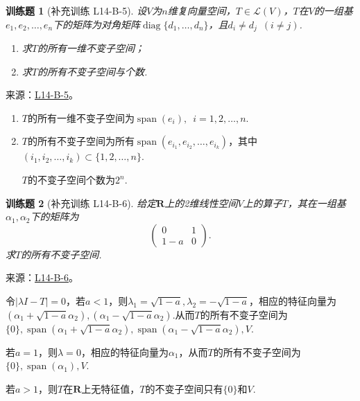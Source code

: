 \documentclass[UTF8,12pt,a4paper,fontset=fandol]{ctexart}
\newtheorem{exercise}{训练题}[section]
\begin{document}
\begin{exercise}[补充训练 L14-B-5]\label{prob:L14-B-5}
设$V$为$n$维复向量空间，$T\in \mathcal{L}(V)$，$T$在$V$的一组基$e_1,e_2,\ldots,e_n$下的矩阵为对角矩阵$\operatorname{diag}\{d_1,\ldots,d_n\}$，且$d_i\neq d_j\enspace(i\neq j)$.
        \begin{enumerate}
            \item 求$T$的所有一维不变子空间；

            \item 求$T$的所有不变子空间与个数.
        \end{enumerate}
\end{exercise}
\noindent 来源：\href{https://github.com/yhwu-is/Linear-Algebra-Left-Undone/blob/new/%E8%AE%B2%E4%B9%89/%E4%B8%93%E9%A2%98/14%20%E7%9B%B8%E4%BC%BC%E6%A0%87%E5%87%86%E5%BD%A2%EF%BC%9A%E5%8A%A8%E6%9C%BA%E4%B8%8E%E5%9F%BA%E7%A1%80.tex}{L14-B-5}。
\begin{solve}
\begin{enumerate}
                \item $T$的所有一维不变子空间为$\operatorname{span}(e_i),\enspace i=1,2,\ldots,n$.
                \item $T$的所有不变子空间为所有$\operatorname{span}(e_{i_1},e_{i_2},\ldots,e_{i_k})$，其中$(i_1,i_2,\ldots,i_k)\subset\{1,2,\ldots,n\}$.

                $T$的不变子空间个数为$2^n$.
            \end{enumerate}
\end{solve}

\begin{exercise}[补充训练 L14-B-6]\label{prob:L14-B-6}
给定$\mathbf{R}$上的2维线性空间$V$上的算子$T$，其在一组基$\alpha_1,\alpha_2$下的矩阵为
        \[\begin{pmatrix}
                0 & 1 \\ 1-a & 0
            \end{pmatrix}.\]
        求$T$的所有不变子空间.
\end{exercise}
\noindent 来源：\href{https://github.com/yhwu-is/Linear-Algebra-Left-Undone/blob/new/%E8%AE%B2%E4%B9%89/%E4%B8%93%E9%A2%98/14%20%E7%9B%B8%E4%BC%BC%E6%A0%87%E5%87%86%E5%BD%A2%EF%BC%9A%E5%8A%A8%E6%9C%BA%E4%B8%8E%E5%9F%BA%E7%A1%80.tex}{L14-B-6}。
\begin{solve}
令$|\lambda I-T|=0$，若$a<1$，则$\lambda_1=\sqrt{1-a},\lambda_2=-\sqrt{1-a}$，相应的特征向量为$(\alpha_1+\sqrt{1-a}\alpha_2),(\alpha_1-\sqrt{1-a}\alpha_2)$.从而$T$的所有不变子空间为$\{0\},\operatorname{span}(\alpha_1+\sqrt{1-a}\alpha_2),\operatorname{span}(\alpha_1-\sqrt{1-a}\alpha_2),V$.

            若$a=1$，则$\lambda=0$，相应的特征向量为$\alpha_1$，从而$T$的所有不变子空间为$\{0\},\operatorname{span}(\alpha_1),V$.

            若$a>1$，则$T$在$\mathbf{R}$上无特征值，$T$的不变子空间只有$\{0\}$和$V$.
\end{solve}
\end{document}

